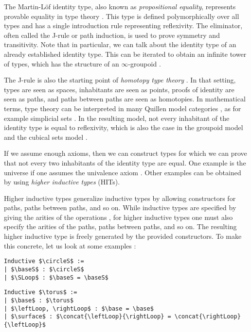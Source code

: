 The Martin-Löf identity type, also known as \emph{propositional equality}, represents provable equality in type theory \cite{martin1975intuitionistic}.
This type is defined polymorphically over all types and has a single introduction rule representing reflexivity.
The eliminator, often called the J-rule or path induction, is used to prove symmetry and transitivity.
Note that in particular, we can talk about the identity type of an already established identity type.
This can be iterated to obtain an infinite tower of types, which has the structure of an $\infty$-groupoid \cite{van2011types,lumsdaine2009weak}.

The J-rule is also the starting point of \emph{homotopy type theory} \cite{hottbook}.
In that setting, types are seen as spaces, inhabitants are seen as points, proofs of identity are seen as paths,
and paths between paths are seen as homotopies.
In mathematical terms, type theory can be interpreted in many Quillen model categories \cite{awodey2009homotopy}, as for example simplicial sets \cite{simpset}.
In the resulting model, not every inhabitant of the identity type is equal to reflexivity,
which is also the case in the groupoid model \cite{MR1686862,HofmannS94} and the cubical sets model \cite{BezemCH13}.

If we assume enough axioms, then we can construct types for which we can prove that not every two inhabitants of the identity type are equal.
One example is the universe if one assumes the univalence axiom \cite{hottbook}.
Other examples can be obtained by using \emph{higher inductive types} (HITs).

Higher inductive types generalize inductive types by allowing constructors for paths, paths between paths, and so on.
While inductive types are specified by giving the arities of the operations \cite{dybjer1994inductive},
for higher inductive types one must also specify the arities of the paths, paths between paths, and so on.
The resulting higher inductive type is freely generated by the provided constructors.
To make this concrete, let us look at some examples \cite{hottbook}:

\begin{center}
\begin{lstlisting}[mathescape=true]
Inductive $\circleS$ :=
| $\baseS$ : $\circleS$
| $\SLoop$ : $\baseS = \baseS$
\end{lstlisting}

\begin{lstlisting}[mathescape=true]
Inductive $\torus$ :=
| $\base$ : $\torus$
| $\leftLoop, \rightLoop$ : $\base = \base$
| $\surface$ : $\concat{\leftLoop}{\rightLoop} = \concat{\rightLoop}{\leftLoop}$
\end{lstlisting}
\end{center}

